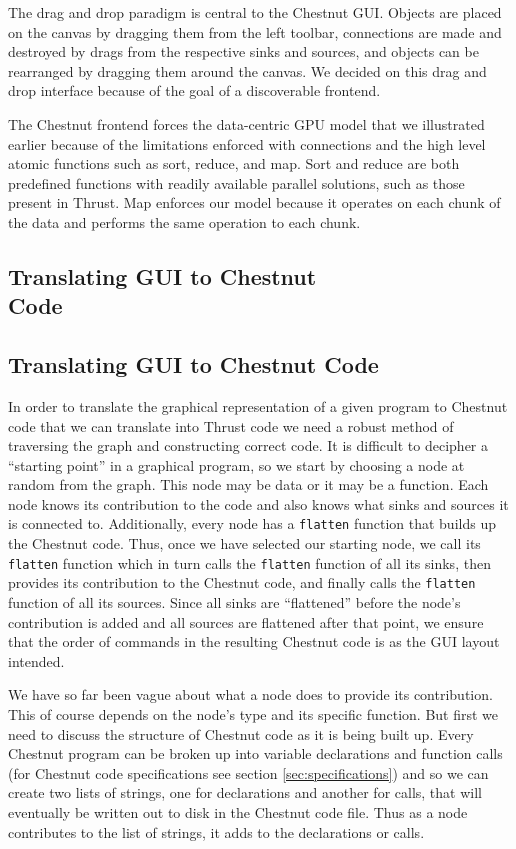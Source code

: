\documentclass[twocolumn]{article}
\renewcommand{\|}{\origbar} %
\newcommand{\code}[1]{\texttt{#1}}
\begin{document}
The drag and drop paradigm is central to the Chestnut GUI. Objects are placed on the canvas by dragging them from the left toolbar, connections are made and destroyed by drags from the respective sinks and sources, and objects can be rearranged by dragging them around the canvas. We decided on this drag and drop interface because of the goal of a discoverable frontend. 

The Chestnut frontend forces the data-centric GPU model that we illustrated earlier because of the limitations enforced with connections and the high level atomic functions such as sort, reduce, and map. Sort and reduce are both predefined functions with readily available parallel solutions, such as those present in Thrust. Map enforces our model because it operates on each chunk of the data and performs the same operation to each chunk.

\if@twocolumn
\subsection{Translating GUI to Chestnut \\ Code}
\else
\subsection{Translating GUI to Chestnut Code} 
\fi

In order to translate the graphical representation of a given program to Chestnut code that we can translate into Thrust code we need a robust method of traversing the graph and constructing correct code. It is difficult to decipher a ``starting point'' in a graphical program, so we start by choosing a node at random from the graph. This node may be data or it may be a function. Each node knows its contribution to the code and also knows what sinks and sources it is connected to. Additionally, every node has a \code{flatten} function that builds up the Chestnut code. Thus, once we have selected our starting node, we call its \code{flatten} function which in turn calls the \code{flatten} function of all its sinks, then provides its contribution to the Chestnut code, and finally calls the \code{flatten} function of all its sources. Since all sinks are ``flattened'' before the node's contribution is added and all sources are flattened after that point, we ensure that the order of commands in the resulting Chestnut code is as the GUI layout intended.

We have so far been vague about what a node does to provide its contribution. This of course depends on the node's type and its specific function. But first we need to discuss the structure of Chestnut code as it is being built up. Every Chestnut program can be broken up into variable declarations and function calls (for Chestnut code specifications see section \ref{sec:specifications}) and so we can create two lists of strings, one for declarations and another for calls, that will eventually be written out to disk in the Chestnut code file. Thus as a node contributes to the list of strings, it adds to the declarations or calls. 
\end{document}
